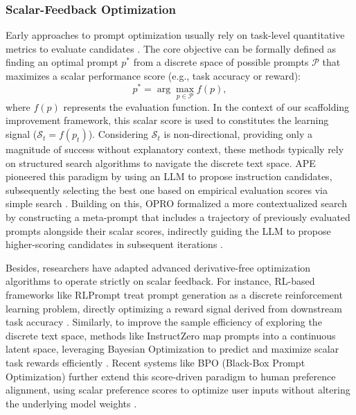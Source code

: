 \subsubsection{Scalar-Feedback Optimization}
\label{sec:Scalar_Feedback_Optimization}

Early approaches to prompt optimization usually rely on task-level quantitative metrics to evaluate candidates \citep{zhou2022large}. The core objective can be formally defined as finding an optimal prompt $p^*$ from a discrete space of possible prompts $\mathcal{P}$ that maximizes a scalar performance score (e.g., task accuracy or reward):
\begin{equation}p^* = \arg\max_{p \in \mathcal{P}} f(p),
\end{equation}
where $f(p)$ represents the evaluation function. In the context of our scaffolding improvement framework, this scalar score is used to constitutes the learning signal ($\mathcal{S}_t = f(p_t)$). Considering $\mathcal{S}_t$ is non-directional, providing only a magnitude of success without explanatory context, these methods typically rely on structured search algorithms to navigate the discrete text space. APE pioneered this paradigm by using an LLM to propose instruction candidates, subsequently selecting the best one based on empirical evaluation scores via simple search \citep{zhou2022large}. Building on this, OPRO formalized a more contextualized search by constructing a meta-prompt that includes a trajectory of previously evaluated prompts alongside their scalar scores, indirectly guiding the LLM to propose higher-scoring candidates in subsequent iterations \citep{yang2023large}.


Besides, researchers have adapted advanced derivative-free optimization algorithms to operate strictly on scalar feedback. For instance, RL-based frameworks like RLPrompt treat prompt generation as a discrete reinforcement learning problem, directly optimizing a reward signal derived from downstream task accuracy \citep{deng2022rlprompt}. Similarly, to improve the sample efficiency of exploring the discrete text space, methods like InstructZero map prompts into a continuous latent space, leveraging Bayesian Optimization to predict and maximize scalar task rewards efficiently \citep{cheninstructzero}. Recent systems like BPO (Black-Box Prompt Optimization) further extend this score-driven paradigm to human preference alignment, using scalar preference scores to optimize user inputs without altering the underlying model weights \citep{cheng2024black}.


